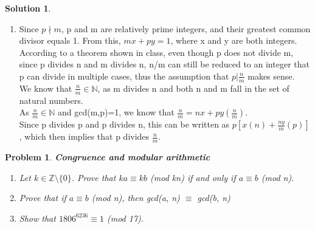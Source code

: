\documentclass{article}
\newtheorem{problem}{Problem}
\theoremstyle{definition}
\newtheorem*{solution}{Solution}
\begin{document}
\begin{solution}
\begin{enumerate}[label=\alph*)]
\item
Since $p \nmid m$, p and m are relatively prime integers, and their greatest common divisor equals 1. From this, $mx + py = 1$, where x and y are both integers.\\
According to a theorem shown in class, even though p does not divide m, since p divides n and m divides n, n/m can still be reduced to an integer that p can divide in multiple cases, thus the assumption that $p|\frac{n}{m}$ makes sense.\\
We know that $\frac{n}{m} \in \mathbb{N}$, as m divides n and both n and m fall in the set of natural numbers.\\
As $\frac{n}{m} \in \mathbb{N}$ and gcd(m,p)=1, we know that $\frac{n}{m} = nx + py(\frac{n}{m})$.\\
Since p divides p and p divides n, this can be written as $p[x(n)+\frac{ny}{m}(p)]$, which then implies that p divides $\frac{n}{m}$.

\end{enumerate}
\end{solution}

\begin{problem}
\textbf{Congruence and modular arithmetic}
\begin{enumerate}[label = \alph*)]
    \item Let $k \in \mathbb{Z}\setminus \{0\}$. Prove that $ka\equiv kb$ (mod kn) if and only if $a\equiv b$ (mod n).
    
    \item Prove that if $a\equiv b$ (mod n), then gcd(a, n) $\equiv$ gcd(b, n)
    
    \item Show that $1806^{6236} \equiv 1$ (mod 17).
\end{enumerate}
\end{problem}
\end{document}
